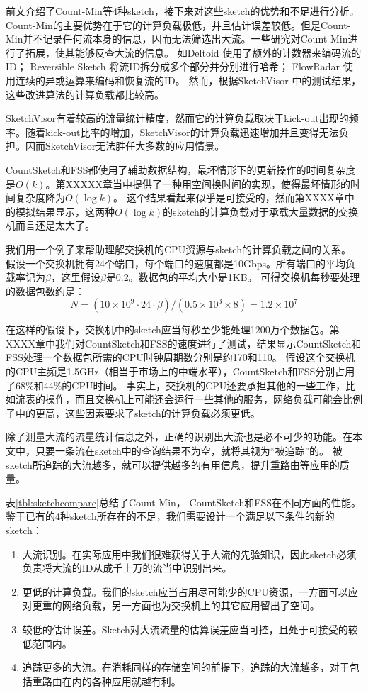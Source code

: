 前文介绍了Count-Min等4种sketch，接下来对这些sketch的优势和不足进行分析。
Count-Min的主要优势在于它的计算负载极低，并且估计误差较低。但是Count-Min并不记录任何流本身的信息，因而无法筛选出大流。一些研究对Count-Min进行了拓展，使其能够反查大流的信息。
如Deltoid \cite{cormode2005s}使用了额外的计数器来编码流的ID；
Reversible Sketch \cite{schweller2007reversible}将流ID拆分成多个部分并分别进行哈希；
FlowRadar \cite{li2016flowradar}使用连续的异或运算来编码和恢复流的ID。
然而，根据SketchVisor \cite{huang2017sketchvisor}中的测试结果，这些改进算法的计算负载都比较高。

SketchVisor有着较高的流量统计精度，然而它的计算负载取决于kick-out出现的频率。随着kick-out比率的增加，SketchVisor的计算负载迅速增加并且变得无法负担。因而SketchVisor无法胜任大多数的应用情景。

CountSketch和FSS都使用了辅助数据结构，最坏情形下的更新操作的时间复杂度是$O(k)$。第XXXXX章当中提供了一种用空间换时间的实现，使得最坏情形的时间复杂度降为$O(\log{k})$。
这个结果看起来似乎是可接受的，然而第XXXX章中的模拟结果显示，这两种$O(\log{k})$的sketch的计算负载对于承载大量数据的交换机而言还是太大了。

我们用一个例子来帮助理解交换机的CPU资源与sketch的计算负载之间的关系。
假设一个交换机拥有24个端口，每个端口的速度都是10Gbps。所有端口的平均负载率记为$\beta$，这里假设$\beta$是0.2。数据包的平均大小是1KB。
可得交换机每秒要处理的数据包数约是：
\begin{equation}%
    N = (10\times 10^9\cdot 24 \cdot \beta)/(0.5\times 10^3 \times 8) = 1.2\times 10^7
\end{equation}

在这样的假设下，交换机中的sketch应当每秒至少能处理1200万个数据包。第XXXX章中我们对CountSketch和FSS的速度进行了测试，结果显示CountSketch和FSS处理一个数据包所需的CPU时钟周期数分别是约170和110。
假设这个交换机的CPU主频是1.5GHz（相当于市场上的中端水平），CountSketch和FSS分别占用了68\%和44\%的CPU时间。
事实上，交换机的CPU还要承担其他的一些工作，比如流表的操作，而且交换机上可能还会运行一些其他的服务，网络负载可能会比例子中的更高，这些因素要求了sketch的计算负载必须更低。

除了测量大流的流量统计信息之外，正确的识别出大流也是必不可少的功能。在本文中，只要一条流在sketch中的查询结果不为空，就将其视为“被追踪”的。
被sketch所追踪的大流越多，就可以提供越多的有用信息，提升重路由等应用的质量。

表\ref{tbl:sketchcompare}总结了Count-Min， CountSketch和FSS在不同方面的性能。鉴于已有的4种sketch所存在的不足，我们需要设计一个满足以下条件的新的sketch：
\begin{enumerate}
	\item 大流识别。在实际应用中我们很难获得关于大流的先验知识，因此sketch必须负责将大流的ID从成千上万的流当中识别出来。
	\item 更低的计算负载。我们的sketch应当占用尽可能少的CPU资源，一方面可以应对更重的网络负载，另一方面也为交换机上的其它应用留出了空间。
	\item 较低的估计误差。Sketch对大流流量的估算误差应当可控，且处于可接受的较低范围内。
	\item 追踪更多的大流。在消耗同样的存储空间的前提下，追踪的大流越多，对于包括重路由在内的各种应用就越有利。
\end{enumerate}
